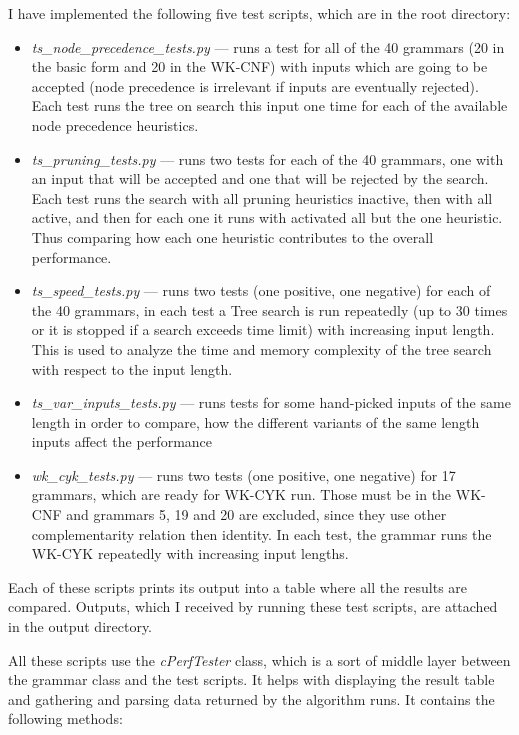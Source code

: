 I have implemented the following five test scripts, which are in the root directory:
\begin{itemize}
  \item{\textit{ts\_node\_precedence\_tests.py} --- runs a test for all of the 40 grammars (20 in the basic form and 20 in the WK-CNF) with inputs which are going to be accepted (node precedence is irrelevant if inputs are eventually rejected). Each test runs the tree on search this input one time for each of the available node precedence heuristics.}

  \item{\textit{ts\_pruning\_tests.py} --- runs two tests for each of the 40 grammars, one with an input that will be accepted and one that will be rejected by the search. Each test runs the search with all pruning heuristics inactive, then with all active, and then for each one it runs with activated all but the one heuristic. Thus comparing how each one heuristic contributes to the overall performance.}

  \item{\textit{ts\_speed\_tests.py} --- runs two tests (one positive, one negative) for each of the 40 grammars, in each test a Tree search is run repeatedly (up to 30 times or it is stopped if a search exceeds time limit) with increasing input length. This is used to analyze the time and memory complexity of the tree search with respect to the input length.}

  \item{\textit{ts\_var\_inputs\_tests.py} --- runs tests for some hand-picked inputs of the same length in order to compare, how the different variants of the same length inputs affect the performance}

  \item{\textit{wk\_cyk\_tests.py} --- runs two tests (one positive, one negative) for 17 grammars, which are ready for WK-CYK run. Those must be in the WK-CNF and grammars 5, 19 and 20 are excluded, since they use other complementarity relation then identity. In each test, the grammar runs the WK-CYK repeatedly with increasing input lengths.}
\end{itemize}

Each of these scripts prints its output into a table where all the results are compared. Outputs, which I received by running these test scripts, are attached in the output directory.

All these scripts use the \textit{cPerfTester} class, which is a sort of middle layer between the grammar class and the test scripts. It helps with displaying the result table and gathering and parsing data returned by the algorithm runs.
It contains the following methods:

